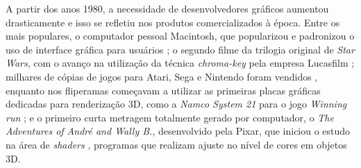 A partir dos anos 1980, a necessidade de desenvolvedores gráficos aumentou drasticamente e isso se refletiu nos produtos comercializados à época. Entre os mais populares, o computador pessoal Macintosh, que popularizou e padronizou o uso de interface gráfica para usuários \cite{macintosh}; o segundo filme da trilogia original de \emph{Star Wars}, com o avanço na utilização da técnica \emph{chroma-key} pela empresa Lucasfilm \cite{chromakey}; milhares de cópias de jogos para Atari, Sega e Nintendo foram vendidos \cite{intrgames}, enquanto nos fliperamas começavam a utilizar as primeiras placas gráficas dedicadas para renderização 3D, como a \emph{Namco System 21} \cite{fujitsu} para o jogo \emph{Winning run} \cite{videogamebum}; e o primeiro curta metragem totalmente gerado por computador, o \emph{The Adventures of André and Wally B.}, desenvolvido pela Pixar, que iniciou o estudo na área de \emph{shaders} \cite{curtapixar}, programas que realizam ajuste no nível de cores em objetos 3D.

